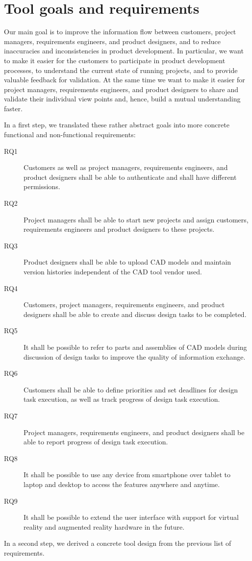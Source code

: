 \section{Tool goals and requirements}
    \label{sec:requirements} 

    Our main goal is to improve the information flow between customers, project managers, requirements engineers, and product designers, and to reduce inaccuracies and inconsistencies in product development.
    In particular, we want to make it easier for the customers to participate in product development processes, to understand the current state of running projects, and to provide valuable feedback for validation.
    At the same time we want to make it easier for project managers, requirements engineers, and product designers to share and validate their individual view points and, hence, build a mutual understanding faster.

    In a first step, we translated these rather abstract goals into more concrete functional and non-functional requirements:
    \begin{description}
        \item[RQ1] Customers as well as project managers, requirements engineers, and product designers shall be able to authenticate and shall have different permissions. 
        \item[RQ2] Project managers shall be able to start new projects and assign customers, requirements engineers and product designers to these projects.
        \item[RQ3] Product designers shall be able to upload CAD models and maintain version histories independent of the CAD tool vendor used.
        \item[RQ4] Customers, project managers, requirements engineers, and product designers shall be able to create and discuss design tasks to be completed.
        \item[RQ5] It shall be possible to refer to parts and assemblies of CAD models during discussion of design tasks to improve the quality of information exchange.
        \item[RQ6] Customers shall be able to define priorities and set deadlines for design task execution, as well as track progress of design task execution.
        \item[RQ7] Project managers, requirements engineers, and product designers shall be able to report progress of design task execution.
        \item[RQ8] It shall be possible to use any device from smartphone over tablet to laptop and desktop to access the features anywhere and anytime.
        \item[RQ9] It shall be possible to extend the user interface with support for virtual reality and augmented reality hardware in the future.
    \end{description}
    In a second step, we derived a concrete tool design from the previous list of requirements.

